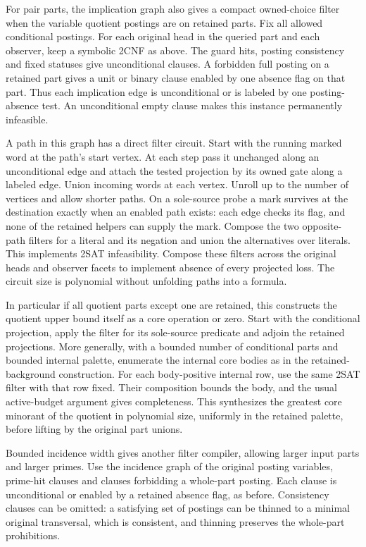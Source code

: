 For pair parts, the implication graph
also gives a compact owned-choice filter
when the variable quotient postings are on
retained parts. Fix all allowed conditional
postings. For each original head in the
queried part and each observer, keep a
symbolic 2CNF as above. The guard hits,
posting consistency and fixed statuses
give unconditional clauses. A forbidden
full posting on a retained part gives a
unit or binary clause enabled by one
absence flag on that part. Thus each
implication edge is unconditional or
is labeled by one posting-absence test.
An unconditional empty clause makes
this instance permanently infeasible.

A path in this graph has a direct filter
circuit. Start with the running marked
word at the path's start vertex. At
each step pass it unchanged along an
unconditional edge and attach the tested
projection by its owned gate along a
labeled edge. Union incoming words at
each vertex. Unroll up to the number
of vertices and allow shorter paths.
On a sole-source probe a mark survives
at the destination exactly when an
enabled path exists: each edge checks
its flag, and none of the retained
helpers can supply the mark. Compose
the two opposite-path filters for a
literal and its negation and union
the alternatives over literals.
This implements 2SAT infeasibility.
Compose these filters across the
original heads and observer facets
to implement absence of every
projected loss. The circuit size is
polynomial without unfolding paths
into a formula.

In particular if all quotient parts
except one are retained, this constructs
the quotient upper bound itself as
a core operation or zero. Start with
the conditional projection, apply the
filter for its sole-source predicate
and adjoin the retained projections.
More generally, with a bounded number
of conditional parts and bounded
internal palette, enumerate the
internal core bodies as in the
retained-background construction.
For each body-positive internal row,
use the same 2SAT filter with that row
fixed. Their composition bounds the
body, and the usual active-budget
argument gives completeness.
This synthesizes the greatest core
minorant of the quotient in polynomial
size, uniformly in the retained palette,
before lifting by the original part
unions.

Bounded incidence width gives another
filter compiler, allowing larger input
parts and larger primes. Use the
incidence graph of the original posting
variables, prime-hit clauses and clauses
forbidding a whole-part posting. Each
clause is unconditional or enabled by
a retained absence flag, as before.
Consistency clauses can be omitted:
a satisfying set of postings can be
thinned to a minimal original transversal,
which is consistent, and thinning preserves
the whole-part prohibitions.

